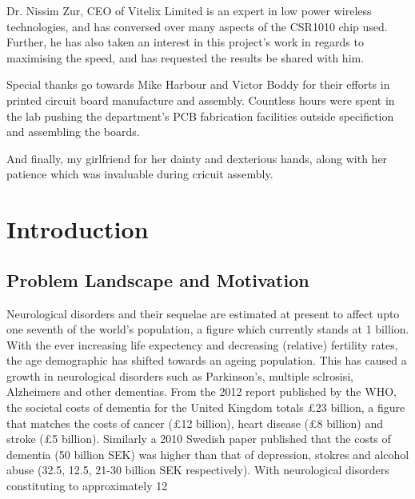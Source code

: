 \documentclass[]{article}
\begin{document}
Dr. Nissim Zur, CEO of Vitelix Limited is an expert in low power wireless technologies, and has conversed over many aspects of the CSR1010 chip used. Further, he has also taken an interest in this project's work in regards to maximising the speed, and has requested the results be shared with him.

Special thanks go towards Mike Harbour and Victor Boddy for their efforts in printed circuit board manufacture and assembly. Countless hours were spent in the lab pushing the department's PCB fabrication facilities outside specifiction and assembling the boards. 

And finally, my girlfriend for her dainty and dexterious hands, along with her patience which was invaluable during cricuit assembly. 

\clearpage

\section{Introduction}

\subsection{Problem Landscape and Motivation}
Neurological disorders and their sequelae are estimated at present to affect upto one seventh of the world's population, a figure which currently stands at 1 billion. With the ever increasing life expectency and decreasing (relative) fertility rates, the age demographic has shifted towards an ageing population. This has caused a growth in neurological disorders such as Parkinson's, multiple sclrosisi, Alzheimers and other dementias. From the 2012 report published by the \ac{WHO}\cite{WorldHealthOrganization2012}, the societal costs of dementia for the United Kingdom totals £23 billion, a figure that matches the costs of cancer (£12 billion), heart disease (£8 billion) and stroke (£5 billion). Similarly a 2010 Swedish paper published that the costs of dementia (50 billion SEK) was higher than that of depression, stokres and alcohol abuse (32.5, 12.5, 21-30 billion SEK respectively)\cite{Wimo2010}. With neurological disorders constituting to approximately 12%
\end{document}
